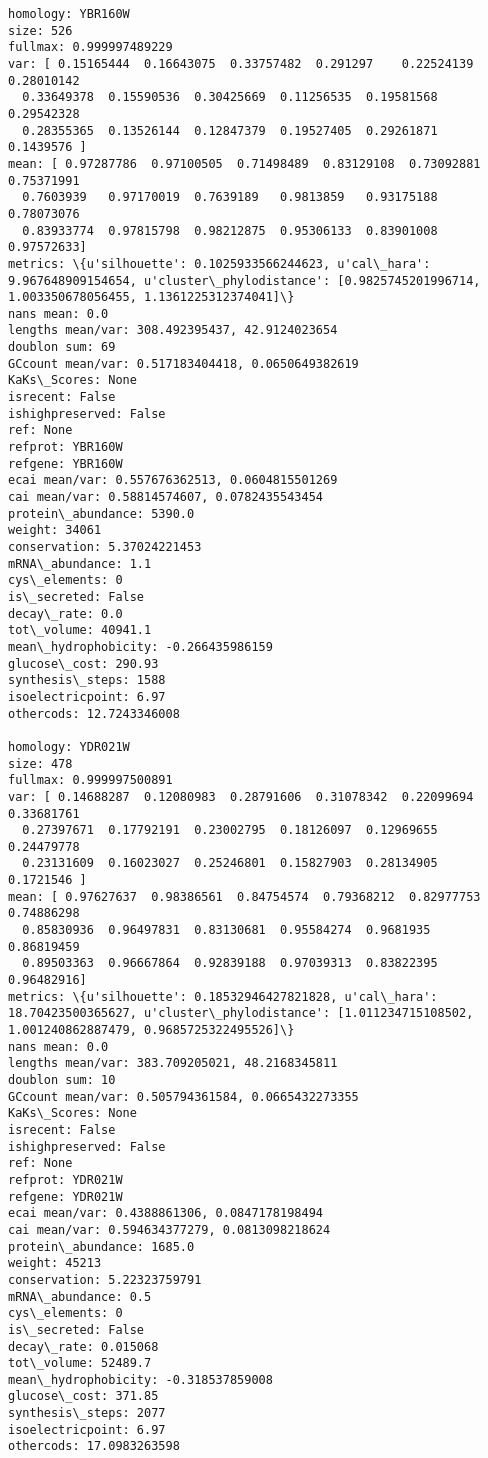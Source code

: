 \documentclass[11pt]{article}
\begin{document}
\begin{Verbatim}[commandchars=\\\{\}]
homology: YBR160W
size: 526
fullmax: 0.999997489229
var: [ 0.15165444  0.16643075  0.33757482  0.291297    0.22524139  0.28010142
  0.33649378  0.15590536  0.30425669  0.11256535  0.19581568  0.29542328
  0.28355365  0.13526144  0.12847379  0.19527405  0.29261871  0.1439576 ]
mean: [ 0.97287786  0.97100505  0.71498489  0.83129108  0.73092881  0.75371991
  0.7603939   0.97170019  0.7639189   0.9813859   0.93175188  0.78073076
  0.83933774  0.97815798  0.98212875  0.95306133  0.83901008  0.97572633]
metrics: \{u'silhouette': 0.1025933566244623, u'cal\_hara': 9.967648909154654, u'cluster\_phylodistance': [0.9825745201996714, 1.003350678056455, 1.1361225312374041]\}
nans mean: 0.0
lengths mean/var: 308.492395437, 42.9124023654
doublon sum: 69
GCcount mean/var: 0.517183404418, 0.0650649382619
KaKs\_Scores: None
isrecent: False
ishighpreserved: False
ref: None
refprot: YBR160W
refgene: YBR160W
ecai mean/var: 0.557676362513, 0.0604815501269
cai mean/var: 0.58814574607, 0.0782435543454
protein\_abundance: 5390.0
weight: 34061
conservation: 5.37024221453
mRNA\_abundance: 1.1
cys\_elements: 0
is\_secreted: False
decay\_rate: 0.0
tot\_volume: 40941.1
mean\_hydrophobicity: -0.266435986159
glucose\_cost: 290.93
synthesis\_steps: 1588
isoelectricpoint: 6.97
othercods: 12.7243346008

homology: YDR021W
size: 478
fullmax: 0.999997500891
var: [ 0.14688287  0.12080983  0.28791606  0.31078342  0.22099694  0.33681761
  0.27397671  0.17792191  0.23002795  0.18126097  0.12969655  0.24479778
  0.23131609  0.16023027  0.25246801  0.15827903  0.28134905  0.1721546 ]
mean: [ 0.97627637  0.98386561  0.84754574  0.79368212  0.82977753  0.74886298
  0.85830936  0.96497831  0.83130681  0.95584274  0.9681935   0.86819459
  0.89503363  0.96667864  0.92839188  0.97039313  0.83822395  0.96482916]
metrics: \{u'silhouette': 0.18532946427821828, u'cal\_hara': 18.70423500365627, u'cluster\_phylodistance': [1.011234715108502, 1.001240862887479, 0.9685725322495526]\}
nans mean: 0.0
lengths mean/var: 383.709205021, 48.2168345811
doublon sum: 10
GCcount mean/var: 0.505794361584, 0.0665432273355
KaKs\_Scores: None
isrecent: False
ishighpreserved: False
ref: None
refprot: YDR021W
refgene: YDR021W
ecai mean/var: 0.4388861306, 0.0847178198494
cai mean/var: 0.594634377279, 0.0813098218624
protein\_abundance: 1685.0
weight: 45213
conservation: 5.22323759791
mRNA\_abundance: 0.5
cys\_elements: 0
is\_secreted: False
decay\_rate: 0.015068
tot\_volume: 52489.7
mean\_hydrophobicity: -0.318537859008
glucose\_cost: 371.85
synthesis\_steps: 2077
isoelectricpoint: 6.97
othercods: 17.0983263598


\end{Verbatim}
\end{document}
